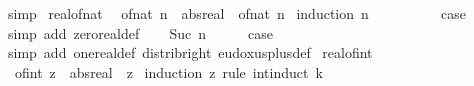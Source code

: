 \begin{isabellebody}
\ simp\isanewline
{}\isamarkupfalse%
%
\endisatagproof
{\isafoldproof}%
%
\isadelimproof
\isanewline
%
\endisadelimproof
\isanewline
{}\isamarkupfalse%
\ real{\isacharunderscore}{\kern0pt}of{\isacharunderscore}{\kern0pt}nat{\isacharcolon}{\kern0pt}\isanewline
\ \ {\isachardoublequoteopen}of{\isacharunderscore}{\kern0pt}nat\ n\ {\isacharequal}{\kern0pt}\ abs{\isacharunderscore}{\kern0pt}real\ {\isacharparenleft}{\kern0pt}{\isacharparenleft}{\kern0pt}{\isacharasterisk}{\kern0pt}{\isacharparenright}{\kern0pt}\ {\isacharparenleft}{\kern0pt}of{\isacharunderscore}{\kern0pt}nat\ n{\isacharparenright}{\kern0pt}{\isacharparenright}{\kern0pt}{\isachardoublequoteclose}\isanewline
%
\isadelimproof
%
\endisadelimproof
%
\isatagproof
{}\isamarkupfalse%
\ {\isacharparenleft}{\kern0pt}induction\ n{\isacharparenright}{\kern0pt}\isanewline
\ \ \isamarkupfalse%
\ {}\isanewline
\ \ \isamarkupfalse%
\ \isamarkupfalse%
\ {\isacharquery}{\kern0pt}case\ \isamarkupfalse%
\ {\isacharparenleft}{\kern0pt}simp\ add{\isacharcolon}{\kern0pt}\ zero{\isacharunderscore}{\kern0pt}real{\isacharunderscore}{\kern0pt}def{\isacharparenright}{\kern0pt}\isanewline
{}\isamarkupfalse%
\isanewline
\ \ \isamarkupfalse%
\ {\isacharparenleft}{\kern0pt}Suc\ n{\isacharparenright}{\kern0pt}\isanewline
\ \ \isamarkupfalse%
\ \isamarkupfalse%
\ {\isacharquery}{\kern0pt}case\ \isamarkupfalse%
\ {\isacharparenleft}{\kern0pt}simp\ add{\isacharcolon}{\kern0pt}\ one{\isacharunderscore}{\kern0pt}real{\isacharunderscore}{\kern0pt}def\ distrib{\isacharunderscore}{\kern0pt}right\ eudoxus{\isacharunderscore}{\kern0pt}plus{\isacharunderscore}{\kern0pt}def{\isacharparenright}{\kern0pt}\isanewline
{}\isamarkupfalse%
%
\endisatagproof
{\isafoldproof}%
%
\isadelimproof
\isanewline
%
\endisadelimproof
\isanewline
{}\isamarkupfalse%
\ real{\isacharunderscore}{\kern0pt}of{\isacharunderscore}{\kern0pt}int{\isacharcolon}{\kern0pt}\isanewline
\ \ {\isachardoublequoteopen}of{\isacharunderscore}{\kern0pt}int\ z\ {\isacharequal}{\kern0pt}\ abs{\isacharunderscore}{\kern0pt}real\ {\isacharparenleft}{\kern0pt}{\isacharparenleft}{\kern0pt}{\isacharasterisk}{\kern0pt}{\isacharparenright}{\kern0pt}\ z{\isacharparenright}{\kern0pt}{\isachardoublequoteclose}\isanewline
%
\isadelimproof
%
\endisadelimproof
%
\isatagproof
{}\isamarkupfalse%
\ {\isacharparenleft}{\kern0pt}induction\ z\ rule{\isacharcolon}{\kern0pt}\ int{\isacharunderscore}{\kern0pt}induct{\isacharbrackleft}{\kern0pt}\ {\isacharquery}{\kern0pt}k{\isacharequal}{\kern0pt}{}{\isacharbrackright}{\kern0pt}{\isacharparenright}{\kern0pt}\isanewline

\end{isabellebody}
